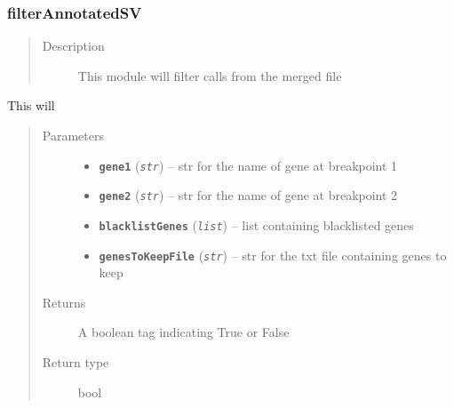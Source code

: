 \documentclass[letterpaper,10pt,english]{sphinxmanual}
\begin{document}
\subsubsection{filterAnnotatedSV}
\label{iCallSV:filterannotatedsv}\begin{quote}\begin{description}
\item[{Description}] \leavevmode
This module will filter calls from the merged file

\end{description}\end{quote}

\begin{fulllineitems}
\label{iCallSV:iCallSV.filterAnnotatedSV.checkBlackListGene}
This will 
\begin{quote}\begin{description}
\item[{Parameters}] \leavevmode\begin{itemize}
\item {} 
\textbf{\texttt{gene1}} (\emph{\texttt{str}}) -- str for the name of gene at breakpoint 1

\item {} 
\textbf{\texttt{gene2}} (\emph{\texttt{str}}) -- str for the name of gene at breakpoint 2

\item {} 
\textbf{\texttt{blacklistGenes}} (\emph{\texttt{list}}) -- list containing blacklisted genes

\item {} 
\textbf{\texttt{genesToKeepFile}} (\emph{\texttt{str}}) -- str for the txt file containing genes to keep

\end{itemize}

\item[{Returns}] \leavevmode
A boolean tag indicating True or False

\item[{Return type}] \leavevmode
bool

\end{description}\end{quote}

\end{fulllineitems}
\end{document}
